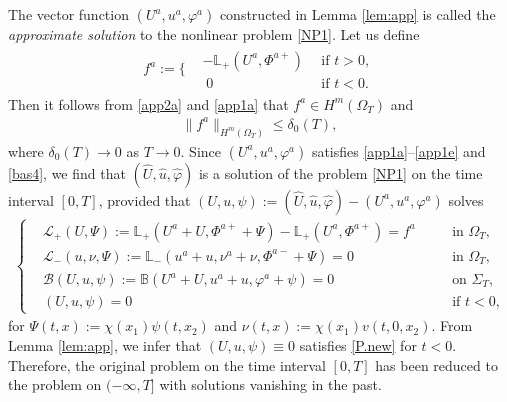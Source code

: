 \documentclass[twoside,11pt]{article}
\numberwithin{equation}{section}
\begin{document}
The vector function $(U^a,u^a,\varphi^a)$ constructed in Lemma \ref{lem:app} is called the {\it approximate solution} to the nonlinear problem \eqref{NP1}. Let us define
\begin{align}\nonumber %
	f^{a}:=
	\bigg\{\begin{aligned}
		& -\mathbb{L}_+(U^{a},\Phi^{a+}) \ \  &\textrm{if }t>0,\\
		& \; 0 \ \  &\textrm{if }t<0.
	\end{aligned}
\end{align}
Then it follows from \eqref{app2a} and \eqref{app1a} that
$	f^{a}\in H^{m}(\Omega_T)$ and
\begin{align}\label{f^a:est}
	\|f^{a}\|_{ H^{m}(\Omega_T)}\leq\delta_0\left(T\right),
\end{align}
where $\delta_0(T)\to 0$ as $T\to 0$.
Since $(U^a,u^a,\varphi^a)$ satisfies \eqref{app1a}--\eqref{app1e} and \eqref{bas4}, we find that
$(\widehat{U},\hat{u},\hat\varphi)$ is a solution of  the problem \eqref{NP1} on the time interval $[0,T]$,
provided that $(U,u,\psi):=(\widehat{U},\hat{u},\hat\varphi)-(U^{a},u^{a},\varphi^a)$ solves
\begin{align} \label{P.new}
	\left\{
	\begin{aligned}
		&\mathcal{L}_+(U,\Psi):=\mathbb{L}_+(U^a+U,\Phi^{a+}+\Psi)-\mathbb{L}_+(U^a,\Phi^{a+})=f^a &\quad &\textrm{in }\Omega_{T},\\[0.3mm]
		&\mathcal{L}_-(u,\nu,\Psi):=\mathbb{L}_-(u^a+u,\nu^a+\nu, \Phi^{a-}+\Psi)=0 &&\textrm{in }\Omega_{T},\\[0.3mm]
		&\mathcal{B}(U,u,\psi):=\mathbb{B}(U^a+U,u^a+u,\varphi^a+\psi)=0&&\textrm{on }\Sigma_T,\\[0.3mm]
		&(U,u,\psi)=0\ &&\textrm{if }t< 0,
	\end{aligned}\right.
\end{align}
for $\Psi(t,x):=\chi(x_1)\psi(t,x_2)$
and $\nu(t,x):=\chi(x_1)v(t,0, x_2)$.
From Lemma \ref{lem:app}, we infer that $(U,u,\psi)\equiv 0$ satisfies \eqref{P.new} for $t<0$.
Therefore, the original problem on the time interval $[0,T]$ has been reduced to the problem on $(-\infty, T]$ with solutions vanishing in the past.
\end{document}
